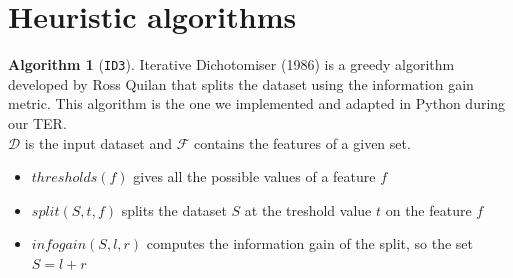 \documentclass[12pt]{report}
\theoremstyle{definition}
\theoremstyle{definition}
\newtheorem*{algo}{Algorithm}
\theoremstyle{definition}
\begin{document}
\section{Heuristic algorithms}
\begin{algo}[\texttt{ID3}]
    Iterative Dichotomiser (1986) is a greedy algorithm developed by Ross Quilan that splits the dataset
    using the information gain metric. This algorithm is the one we implemented and adapted in Python during
    our TER.\\
    $\mathcal{D}$ is the input dataset and $\mathcal{F}$ contains the features of a given set.

    \begin{algorithm}
        \caption{\texttt{ID3}}\label{alg:two}
        \DontPrintSemicolon

        \;
        \;

    \end{algorithm}

    \begin{itemize}
        \item $thresholds(f)$ gives all the possible values of a feature $f$
        \item $split(S, t, f)$ splits the dataset $S$ at the treshold value $t$ on the feature $f$
        \item $infogain(S, l, r)$ computes the information gain of the split, so the set $S=l+r$ 
    \end{itemize}
\end{algo}
\end{document}
